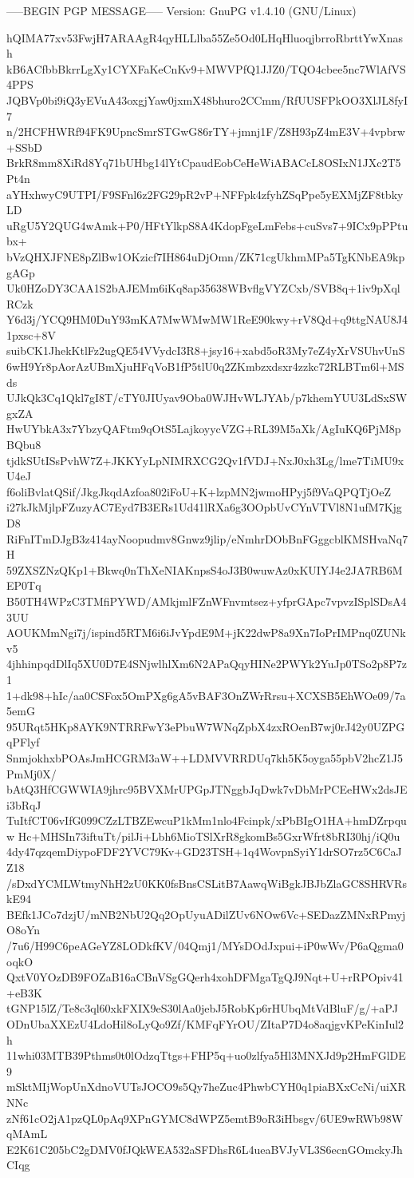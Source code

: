 -----BEGIN PGP MESSAGE-----
Version: GnuPG v1.4.10 (GNU/Linux)

hQIMA77xv53FwjH7ARAAgR4qyHLLlba55Ze5Od0LHqHluoqjbrroRbrttYwXnash
kB6ACfbbBkrrLgXy1CYXFaKeCnKv9+MWVPfQ1JJZ0/TQO4cbee5nc7WlAfVS4PPS
JQBVp0bi9iQ3yEVuA43oxgjYaw0jxmX48bhuro2CCmm/RfUUSFPkOO3XlJL8fyI7
n/2HCFHWRf94FK9UpncSmrSTGwG86rTY+jmnj1F/Z8H93pZ4mE3V+4vpbrw+SSbD
BrkR8mm8XiRd8Yq71bUHbg14lYtCpaudEobCeHeWiABACcL8OSIxN1JXc2T5Pt4n
aYHxhwyC9UTPI/F9SFnl6z2FG29pR2vP+NFFpk4zfyhZSqPpe5yEXMjZF8tbkyLD
uRgU5Y2QUG4wAmk+P0/HFtYlkpS8A4KdopFgeLmFebs+cuSvs7+9ICx9pPPtubx+
bVzQHXJFNE8pZlBw1OKzicf7IH864uDjOmn/ZK71cgUkhmMPa5TgKNbEA9kpgAGp
Uk0HZoDY3CAA1S2bAJEMm6iKq8ap35638WBvflgVYZCxb/SVB8q+1iv9pXqlRCzk
Y6d3j/YCQ9HM0DuY93mKA7MwWMwMW1ReE90kwy+rV8Qd+q9ttgNAU8J41pxsc+8V
suibCK1JhekKtlFz2ugQE54VVydcI3R8+jsy16+xabd5oR3My7eZ4yXrVSUhvUnS
6wH9Yr8pAorAzUBmXjuHFqVoB1fP5tlU0q2ZKmbzxdsxr4zzkc72RLBTm6l+MSds
UJkQk3Cq1Qkl7gI8T/cTY0JIUyav9Oba0WJHvWLJYAb/p7khemYUU3LdSxSWgxZA
HwUYbkA3x7YbzyQAFtm9qOtS5LajkoyycVZG+RL39M5aXk/AgIuKQ6PjM8pBQbu8
tjdkSUtISsPvhW7Z+JKKYyLpNIMRXCG2Qv1fVDJ+NxJ0xh3Lg/lme7TiMU9xU4eJ
f6oliBvlatQSif/JkgJkqdAzfoa802iFoU+K+lzpMN2jwmoHPyj5f9VaQPQTjOeZ
i27kJkMjlpFZuzyAC7Eyd7B3ERs1Ud41lRXa6g3OOpbUvCYnVTVl8N1ufM7KjgD8
RiFnITmDJgB3z414ayNoopudmv8Gnwz9jlip/eNmhrDObBnFGggcblKMSHvaNq7H
59ZXSZNzQKp1+Bkwq0nThXeNIAKnpsS4oJ3B0wuwAz0xKUIYJ4e2JA7RB6MEP0Tq
B50TH4WPzC3TMfiPYWD/AMkjmlFZnWFnvmtsez+yfprGApc7vpvzISplSDsA43UU
AOUKMmNgi7j/ispind5RTM6i6iJvYpdE9M+jK22dwP8a9Xn7IoPrIMPnq0ZUNkv5
4jhhinpqdDlIq5XU0D7E4SNjwlhlXm6N2APaQqyHINe2PWYk2YuJp0TSo2p8P7z1
1+dk98+hIc/aa0CSFox5OmPXg6gA5vBAF3OnZWrRrsu+XCXSB5EhWOe09/7a5emG
95URqt5HKp8AYK9NTRRFwY3ePbuW7WNqZpbX4zxROenB7wj0rJ42y0UZPGqPFlyf
SnmjokhxbPOAsJmHCGRM3aW++LDMVVRRDUq7kh5K5oyga55pbV2hcZ1J5PmMj0X/
bAtQ3HfCGWWIA9jhrc95BVXMrUPGpJTNggbJqDwk7vDbMrPCEeHWx2dsJEi3bRqJ
TuItfCT06vIfG099CZzLTBZEwcuP1kMm1nlo4Fcinpk/xPbBIgO1HA+hmDZrpquw
Hc+MHSIn73iftuTt/pilJi+Lbh6MioTSlXrR8gkomBs5GxrWfrt8bRI30hj/iQ0u
4dy47qzqemDiypoFDF2YVC79Kv+GD23TSH+1q4WovpnSyiY1drSO7rz5C6CaJZ18
/sDxdYCMLWtmyNhH2zU0KK0fsBnsCSLitB7AawqWiBgkJBJbZlaGC8SHRVRskE94
BEfk1JCo7dzjU/mNB2NbU2Qq2OpUyuADilZUv6NOw6Vc+SEDazZMNxRPmyjO8oYn
/7u6/H99C6peAGeYZ8LODkfKV/04Qmj1/MYsDOdJxpui+iP0wWv/P6aQgma0oqkO
QxtV0YOzDB9FOZaB16aCBnVSgGQerh4xohDFMgaTgQJ9Nqt+U+rRPOpiv41+eB3K
tGNP15lZ/Te8c3ql60xkFXIX9eS30lAa0jebJ5RobKp6rHUbqMtVdBluF/g/+aPJ
ODnUbaXXEzU4LdoHil8oLyQo9Zf/KMFqFYrOU/ZItaP7D4o8aqjgvKPeKinIul2h
11whi03MTB39Pthms0t0lOdzqTtgs+FHP5q+uo0zlfya5Hl3MNXJd9p2HmFGlDE9
mSktMIjWopUnXdnoVUTsJOCO9s5Qy7heZuc4PhwbCYH0q1piaBXxCcNi/uiXRNNc
zNf61cO2jA1pzQL0pAq9XPnGYMC8dWPZ5emtB9oR3iHbsgv/6UE9wRWb98WqMAmL
E2K61C205bC2gDMV0fJQkWEA532aSFDhsR6L4ueaBVJyVL3S6ecnGOmckyJhCIqg
